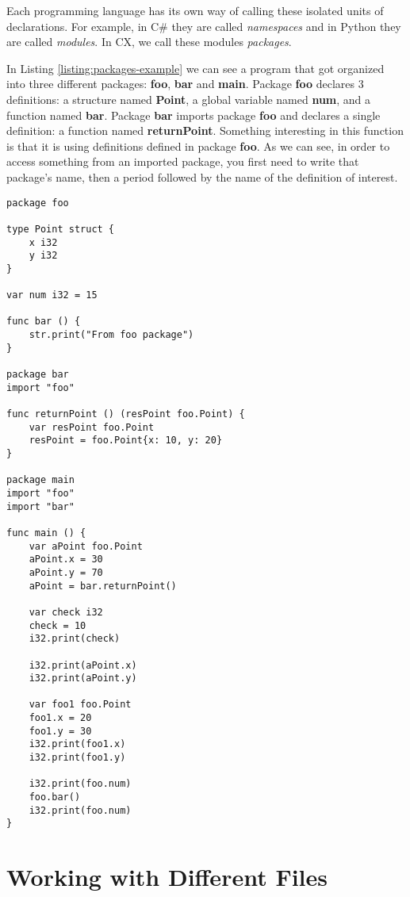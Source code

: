 \documentclass[11pt,fleqn,openany]{book} %
\begin{document}
Each programming language has its own way of calling these isolated units of declarations. For example, in C\# they are called \emph{namespaces} and in Python they are called \emph{modules}. In  CX, we call these modules \emph{packages}.

In Listing \ref{listing:packages-example} we can see a program that got organized into three different packages: \textbf{foo}, \textbf{bar} and \textbf{main}. Package \textbf{foo} declares 3 definitions: a structure named \textbf{Point}, a global variable named \textbf{num}, and a function named \textbf{bar}. Package \textbf{bar} imports package \textbf{foo} and declares a single definition: a function named \textbf{returnPoint}. Something interesting in this function is that it is using definitions defined in package \textbf{foo}. As we can see, in order to access something from an imported package, you first need to write that package's name, then a period followed by the name of the definition of interest.

\begin{lstlisting}[caption={Importing Packages Example},captionpos=b,label={listing:packages-example}]
package foo

type Point struct {
	x i32
	y i32
}

var num i32 = 15

func bar () {
	str.print("From foo package")
}

package bar
import "foo"

func returnPoint () (resPoint foo.Point) {
	var resPoint foo.Point
	resPoint = foo.Point{x: 10, y: 20}
}

package main
import "foo"
import "bar"

func main () {
	var aPoint foo.Point
	aPoint.x = 30
	aPoint.y = 70
	aPoint = bar.returnPoint()

	var check i32
	check = 10
	i32.print(check)
	
	i32.print(aPoint.x)
	i32.print(aPoint.y)

	var foo1 foo.Point
	foo1.x = 20
	foo1.y = 30
	i32.print(foo1.x)
	i32.print(foo1.y)
	
	i32.print(foo.num)
	foo.bar()
	i32.print(foo.num)
}
\end{lstlisting}

\section{Working with Different Files}
\end{document}
